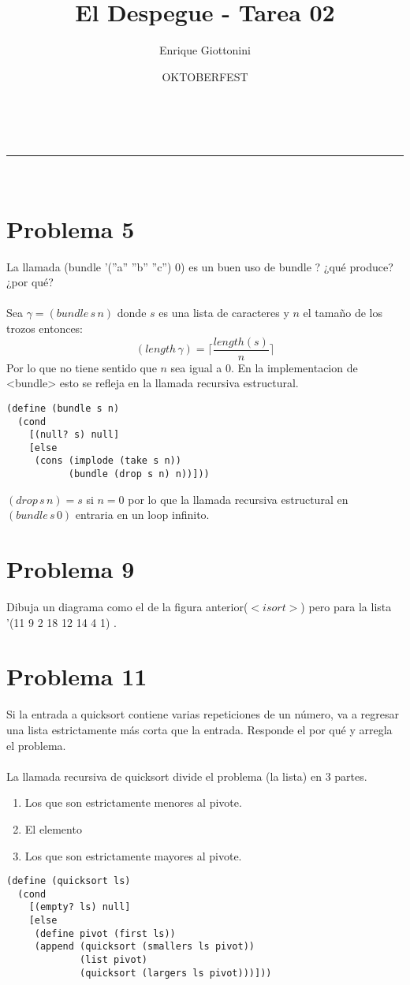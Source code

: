 \documentclass[a4paper,11pt]{article}
\makeatletter
\newcommand{\linia}{\rule{\linewidth}{0.5pt}}
\theoremstyle{mytheor}
\renewcommand{\maketitle}{
\begin{center}
\vspace{2ex}
{\huge \textsc{\@title}}
\vspace{1ex}
\\
\linia\\
\@author \hfill \@date
\vspace{4ex}
\end{center}
}
\makeatother
\begin{document}
\title{El Despegue - Tarea \textnumero{} 02}

\author{Enrique Giottonini}

\date{OKTOBERFEST}

\maketitle

\section*{Problema 5}
La llamada (bundle ’(”a” ”b” ”c”) 0) es un buen uso de bundle ? ¿qué produce?
¿por qué? \\ \\
Sea $\gamma = (bundle\, s\, n)$ donde $s$ es una lista de caracteres y $n$ el tamaño de los trozos entonces:
\[ (length\,\gamma) = \Big \lceil \dfrac{length(s)}{n}\Big \rceil\]
Por lo que no tiene sentido que $n$ sea igual a 0. En la implementacion de <bundle> esto se refleja en la llamada recursiva estructural.

\begin{lstlisting}[label={list:first},caption=bundle.]
(define (bundle s n)
  (cond
    [(null? s) null]
    [else
     (cons (implode (take s n))
           (bundle (drop s n) n))]))
\end{lstlisting}

$(drop \,s \,n) = s$ si $n=0$ por lo que la llamada recursiva estructural en $(bundle\, s\, 0)$ entraria en un loop infinito.
\\
 

\section*{Problema 9}
Dibuja un diagrama como el de la figura anterior($<isort>$) pero para la lista ’(11 9 2 18 12
14 4 1) .

\newpage
\section*{Problema 11}
Si la entrada a quicksort contiene varias repeticiones de un número, va a regresar
una lista estrictamente más corta que la entrada. Responde el por qué y arregla el problema. \\ \\

La llamada recursiva de quicksort divide el problema (la lista) en 3 partes.
\begin{enumerate}
\item Los que son estrictamente menores al pivote.
\item El elemento
\item Los que son estrictamente mayores al pivote.
\end{enumerate}
\begin{lstlisting}[label={list:first},caption=quicksort.]
(define (quicksort ls)
  (cond
    [(empty? ls) null]
    [else
     (define pivot (first ls))
     (append (quicksort (smallers ls pivot))
             (list pivot)
             (quicksort (largers ls pivot)))]))
\end{lstlisting}
\end{document}
